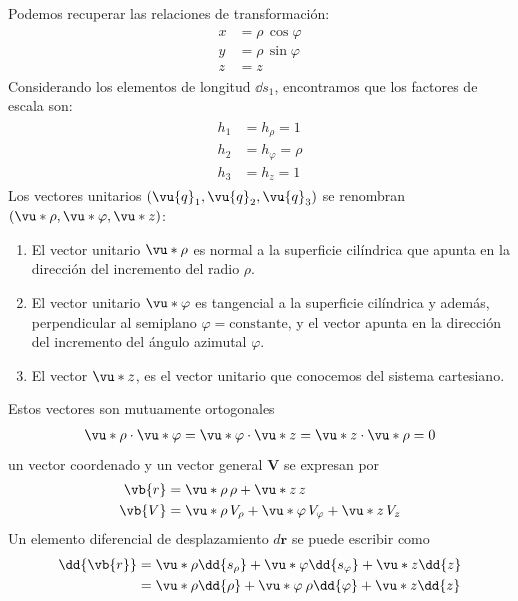 Podemos recuperar las relaciones de transformación:
\begin{align}
\begin{aligned}
x &= \rho \, \cos \varphi \\
y &= \rho \, \sin \varphi \\
z &= z
\end{aligned}
\label{eq:ecuacion_02_028}
\end{align}
Considerando los elementos de longitud $\dd{s_{1}}$, encontramos que los factores de escala son:
\begin{align}
\begin{aligned}
h_{1} &= h_{\rho} = 1 \\
h_{2} &= h_{\varphi} = \rho \\
h_{3} &= h_{z} = 1
\end{aligned}
\label{eq:ecuacion_02_029}
\end{align}
Los vectores unitarios $(\vu{q}_{1},\vu{q}_{2},\vu{q}_{3})$ se renombran $(\vu*{\rho},\vu*{\varphi},\vu*{z})$:
\begin{enumerate}
\item El vector unitario $\vu*{\rho}$ es normal a la superficie cilíndrica que apunta en la dirección del incremento del radio $\rho$.
\item El vector unitario $\vu*{\varphi}$ es tangencial a la superficie cilíndrica y además, perpendicular al semiplano $\varphi=\text{constante}$, y el vector apunta en la dirección del incremento del ángulo azimutal $\varphi$.
\item El vector $\vu*{z}$, es el vector unitario que conocemos del sistema cartesiano.
\end{enumerate}
Estos vectores son mutuamente ortogonales
\begin{align*}
\vu*{\rho} \cdot \vu*{\varphi} = \vu*{\varphi} \cdot \vu*{z} = \vu*{z} \cdot \vu*{\rho} = 0
\end{align*}
un vector coordenado y un vector general $\mathbf{V}$ se expresan por
\begin{align*}
\vb{r} &= \vu*{\rho} \, \rho + \vu*{z} \, z \\
\vb{V} &=  \vu*{\rho} \, V_{\rho} + \vu*{\varphi} \, V_{\varphi} + \vu*{z} \, V_{z}
\end{align*}
Un elemento diferencial de desplazamiento $d \mathbf{r}$ se puede escribir como
\begin{align}
\begin{aligned}
\dd{\vb{r}} &= \vu*{\rho} \dd{s_{\rho}} + \vu*{\varphi}  \dd{s_{\varphi}} + \vu*{z} \dd{z} \\
&= \vu*{\rho} \dd{\rho} + \vu*{\varphi} \: \rho \dd{\varphi} + \vu*{z} \dd{z}
\end{aligned}
\end{align}
